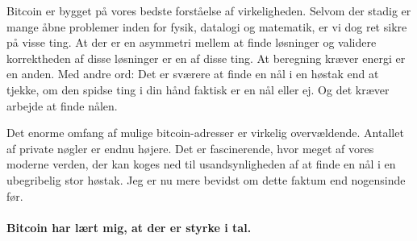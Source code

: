 \documentclass[paper=6in:9in,pagesize=pdftex,headinclude=on,footinclude=on,12pt]{scrbook}
\begin{document}
Bitcoin er bygget på vores bedste forståelse af virkeligheden. Selvom der stadig er mange åbne problemer inden for fysik, datalogi og matematik, er vi dog ret sikre på visse ting. At der er en asymmetri mellem at finde løsninger og validere korrektheden af disse løsninger er en af disse ting. At beregning kræver energi er en anden. Med andre ord: Det er sværere at finde en nål i en høstak end at tjekke, om den spidse ting i din hånd faktisk er en nål eller ej. Og det kræver arbejde at finde nålen.

Det enorme omfang af mulige bitcoin-adresser er virkelig overvældende. Antallet af private nøgler er endnu højere. Det er fascinerende, hvor meget af vores moderne verden, der kan koges ned til usandsynligheden af at finde en nål i en ubegribelig stor høstak. Jeg er nu mere bevidst om dette faktum end nogensinde før.\paragraph{Bitcoin har lært mig, at der er styrke i tal.}%
%
%
%
%
\end{document}
